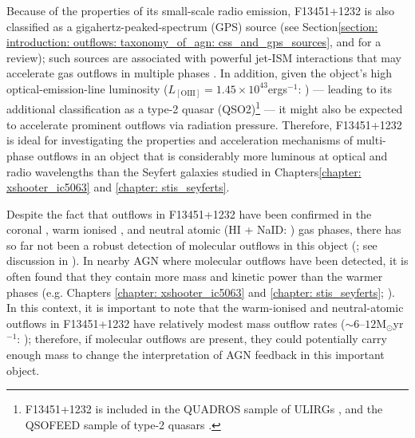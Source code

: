 Because of the properties of its small-scale radio emission, F13451+1232 is also classified as a gigahertz-peaked-spectrum (GPS) source (see Section\;\ref{section: introduction: outflows: taxonomy_of_agn: css_and_gps_sources}, and \citealt{ODea2021} for a review); such sources are associated with powerful jet-ISM interactions that may accelerate gas outflows in multiple phases \citep{Mukherjee2016, Holt2006, Santoro2018, Santoro2020, Kukreti2023}. In addition, given the object's high optical-emission-line luminosity ($L_\mathrm{[OIII]}=1.45\times10^{43}$\;erg\;s$^{-1}$: \citealt{Rose2018}) --- leading to its additional classification as a type-2 quasar (QSO2)\footnote{F13451+1232 is included in the QUADROS sample of ULIRGs \citep{Rose2018}, and the QSOFEED sample of type-2 quasars \citep{RamosAlmeida2022}.} --- it might also be expected to accelerate prominent outflows via radiation pressure. Therefore, F13451+1232 is ideal for investigating the properties and acceleration mechanisms of multi-phase outflows in an object that is considerably more luminous at optical and radio wavelengths than the Seyfert galaxies studied in Chapters\;\ref{chapter: xshooter_ic5063} and \ref{chapter: stis_seyferts}.

Despite the fact that outflows in F13451+1232 have been confirmed in the coronal \citep{VillarMartin2023}, warm ionised \citep{Holt2003, Holt2011, Rose2018, VillarMartin2023}, and neutral atomic (HI + NaID: \citealt{Morganti2005, Rupke2005, Morganti2013_4c1250}) gas phases, there has so far not been a robust detection of molecular outflows in this object (\citealt{Fotopoulou2019, Lamperti2022}; see discussion in \citealt{VillarMartin2023}). In nearby AGN where molecular outflows have been detected, it is often found that they contain more mass and kinetic power than the warmer phases (e.g. Chapters \ref{chapter: xshooter_ic5063} and \ref{chapter: stis_seyferts}; \citealt{Fiore2017, RamosAlmeida2019, Speranza2024}). In this context, it is important to note that the warm-ionised and neutral-atomic outflows in F13451+1232 have relatively modest mass outflow rates ($\sim$6--$12$\;M$_\odot$\;yr$^{-1}$: \citealt{Morganti2013_4c1250, Rose2018}); therefore, if molecular outflows are present, they could potentially carry enough mass to change the interpretation of AGN feedback in this important object. 

